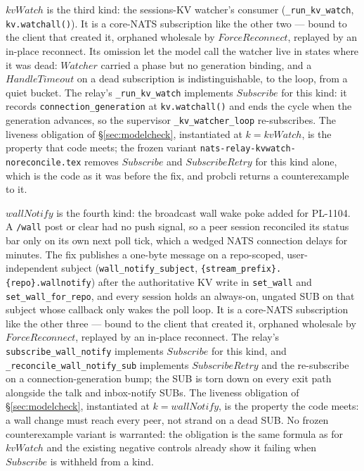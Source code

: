 \documentclass[a4paper,10pt,fleqn]{article}
\begin{document}
$kvWatch$ is the third kind: the sessions-KV watcher's consumer
(\texttt{\_run\_kv\_watch}, \texttt{kv.watchall()}).  It is a core-NATS
subscription like the other two --- bound to the client that created it,
orphaned wholesale by $ForceReconnect$, replayed by an in-place reconnect.
Its omission let the model call the watcher live in states where it was
dead: $Watcher$ carried a phase but no generation binding, and a $HandleTimeout$
on a dead subscription is indistinguishable, to the loop, from a quiet
bucket.  The relay's \texttt{\_run\_kv\_watch} implements $Subscribe$ for this
kind: it records \texttt{connection\_generation} at \texttt{kv.watchall()}
and ends the cycle when the generation advances, so the supervisor
\texttt{\_kv\_watcher\_loop} re-subscribes.  The liveness obligation of
\S\ref{sec:modelcheck}, instantiated at $k = kvWatch$, is the property that
code meets; the frozen variant \texttt{nats-relay-kvwatch-noreconcile.tex}
removes $Subscribe$ and $SubscribeRetry$ for this kind alone, which is the
code as it was before the fix, and probcli returns a counterexample to it.

$wallNotify$ is the fourth kind: the broadcast wall wake poke added for
PL-1104.  A \texttt{/wall} post or clear had no push signal, so a peer
session reconciled its status bar only on its own next poll tick, which a
wedged NATS connection delays for minutes.  The fix publishes a one-byte
message on a repo-scoped, user-independent subject
(\texttt{wall\_notify\_subject}, \texttt{\{stream\_prefix\}.\{repo\}.wallnotify})
after the authoritative KV write in \texttt{set\_wall} and
\texttt{set\_wall\_for\_repo}, and every session holds an always-on,
ungated SUB on that subject whose callback only wakes the poll loop.  It is
a core-NATS subscription like the other three --- bound to the client that
created it, orphaned wholesale by $ForceReconnect$, replayed by an in-place
reconnect.  The relay's \texttt{subscribe\_wall\_notify} implements
$Subscribe$ for this kind, and \texttt{\_reconcile\_wall\_notify\_sub}
implements $SubscribeRetry$ and the re-subscribe on a
connection-generation bump; the SUB is torn down on every exit path
alongside the talk and inbox-notify SUBs.  The liveness obligation of
\S\ref{sec:modelcheck}, instantiated at $k = wallNotify$, is the property
the code meets: a wall change must reach every peer, not strand on a dead
SUB.  No frozen counterexample variant is warranted: the obligation is
the same formula as for $kvWatch$ and the existing negative controls
already show it failing when $Subscribe$ is withheld from a kind.
\end{document}
